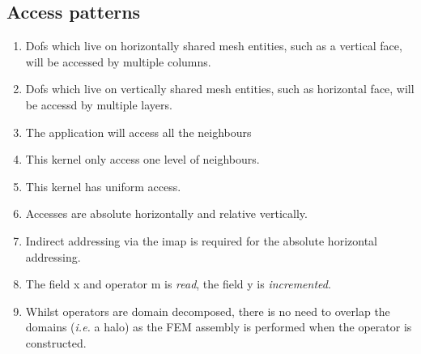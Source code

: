 \documentclass{report}
\begin{document}
\subsection{Access patterns}
\begin{enumerate}
 \item Dofs which live on horizontally shared mesh entities, such as a
       vertical face, will be accessed by multiple columns.
     \item Dofs which live on vertically shared mesh entities, such as
       horizontal face, will be accessd by multiple layers.
     \item The application will access all the neighbours
     \item This kernel only access one level of neighbours.
     \item This kernel has uniform access.
     \item Accesses are absolute horizontally and relative vertically.
     \item Indirect addressing via the imap is required for the
       absolute horizontal addressing.
     \item The field x and operator m is {\em read}, the field y is {\em incremented}.
     \item Whilst operators are domain decomposed, there is no need to overlap the domains ({\em i.e.} a halo) as the FEM assembly is performed when the operator is constructed.
\end{enumerate}
\end{document}
